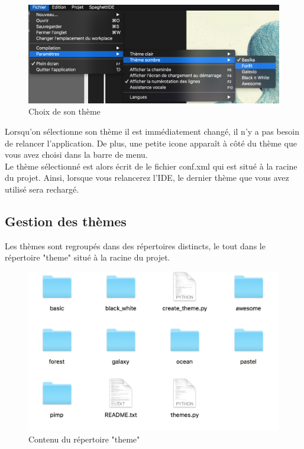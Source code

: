 \documentclass[a4paper,12pt]{article}
\begin{document}
			\begin{figure}[h!]
				\begin{center}
					\includegraphics[scale=0.5]{images/imgs_themes/choix_theme}
					\caption{Choix de son thème}
				\end{center}
			\end{figure}
			
			Lorsqu'on sélectionne son thème il est immédiatement changé, il n'y a pas besoin de relancer l'application. De plus, une petite icone apparaît à côté du thème que vous avez choisi dans la barre de menu.\\
			
			Le thème sélectionné est alors écrit de le fichier conf.xml qui est situé à la racine du projet. Ainsi, lorsque vous relancerez l'IDE, le dernier thème que vous avez utilisé sera rechargé.
			
		\subsection{Gestion des thèmes}
		
			Les thèmes sont regroupés dans des répertoires distincts, le tout dans le répertoire "theme" situé à la racine du projet. 
			\begin{figure}[h!]
				\begin{center}
					\includegraphics[scale=0.7]{images/imgs_themes/themes}
					\caption{Contenu du répertoire "theme"}
				\end{center}
			\end{figure}
			
\end{document}
